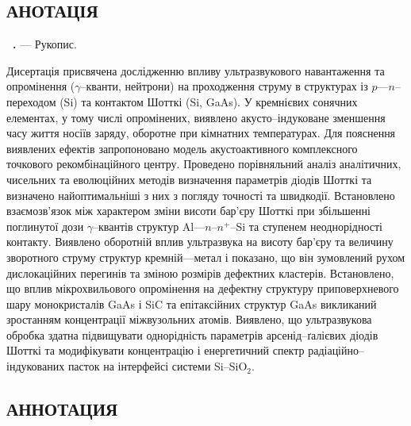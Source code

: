 \begin{center}
\section*{\MakeUppercase{анотація}}
\end{center}

\vspace{-1.5em}

\textbf{\thesisAuthorFIO~\thesisTitle.} --- Рукопис.

\abstractBegin

Дисертація присвячена дослідженню впливу ультразвукового навантаження та опромінення ($\gamma$--кванти, нейтрони)
на проходження струму в структурах із $p$---$n$--переходом (Si) та контактом Шотткі (Si, GaAs).
У кремнієвих сонячних елементах, у тому числі опромінених,
 виявлено акусто--індуковане зменшення часу життя носіїв заряду, оборотне при кімнатних температурах.
 Для пояснення виявлених ефектів запропоновано модель акустоактивного комплексного точкового рекомбінаційного центру.
 Проведено порівняльний аналіз аналітичних, чисельних та еволюційних методів визначення параметрів діодів Шотткі 
 та визначено найоптимальніші з них з погляду точності та швидкодії.
 Встановлено взаємозв'язок між характером зміни висоти бар'єру Шотткі при збільшенні поглинутої дози $\gamma$--квантів структур Al---$n$--$n^+$--Si та ступенем неоднорідності контакту.
 Виявлено оборотній вплив ультразвука на висоту бар'єру та величину зворотного струму структур кремній---метал і показано, що він зумовлений рухом дислокаційних перегинів та зміною розмірів дефектних кластерів.
 Встановлено, що вплив мікрохвильового опромінення на дефектну структуру приповерхневого шару монокристалів GaAs і SiC та епітаксійних структур GaAs
 викликаний зростанням концентрації міжвузольних атомів.
 Виявлено, що ультразвукова обробка здатна підвищувати однорідність параметрів арсенід--ґалієвих діодів Шотткі та модифікувати концентрацію і енергетичний спектр радіаційно--індукованих пасток  на інтерфейсі системи  Si--SiO$_2$.

\keywords


\begin{center}
{\section*{\MakeUppercase{АННОТАЦИЯ}}}
\end{center}

